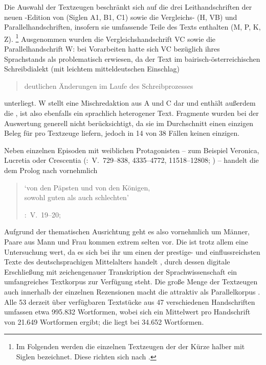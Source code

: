 Die Auswahl der Textzeugen beschränkt sich auf die drei Leithandschriften der
neuen \KC{}-Edition von \citeauthor{chincaetal2019b} (Siglen A1, B1, C1) sowie
die Vergleichs- (H, VB) und Parallelhandschriften, insofern sie umfassende
Teile des Texts enthalten (M, P, K, Z).%
%
	\footnote{Im Folgenden werden die einzelnen Textzeugen der \KC{} der
	Kürze halber mit Siglen bezeichnet. Diese richten sich nach
	 \autocite{kcdigital}.}
%
Ausgenommen wurden die Vergleichshandschrift VC sowie die Parallelhandschrift
W: bei Vorarbeiten hatte sich VC bezüglich ihres Sprachstands als problematisch
erwiesen, da der Text im bairisch-österreichischen
Schreibdialekt (mit leichtem mitteldeutschen Einschlag)
\blockcquote[73]{wolf:kckat}{deutlichen Änderungen im Laufe des
Schreibprozesses} unterliegt. W stellt eine Mischredaktion aus A und C dar und
enthält außerdem die  \autocite[48--54]{weis2022},
ist also ebenfalls ein sprachlich heterogener Text. Fragmente wurden bei der
Auswertung generell nicht berücksichtigt, da sie im Durchschnitt einen einzigen
Beleg für  pro Textzeuge liefern, jedoch in 14 von 38 Fällen keinen
einzigen.

Neben einzelnen Episoden mit weiblichen Protagonisten -- zum Beispiel Veronica,
Lucretia oder Crescentia (\KC:~V.~729--838, 4335--4772, 11518--12808;
\cite[vgl.][94--96, 161--169, 292--314]{schroeder1895}) -- handelt die \KC{} dem
Prolog nach vornehmlich

\blockquote[{\KC:~V.~19--20; \cite[79]{schroeder1895}}]{

	`von den Päpsten und von den Königen,\\
	sowohl guten als auch schlechten'
}

Aufgrund der thematischen Ausrichtung geht es also vornehmlich um Männer, Paare
aus Mann und Frau kommen extrem selten vor. Die \KC{} ist trotz allem eine
Untersuchung wert, da es sich bei ihr um einen der prestige- und
einflussreichsten Texte des deutschsprachigen Mittelalters handelt
\autocite[93]{wolf2008}, durch dessen digitale Erschließung mit zeichengenauer
Transkription \autocite{kcdigital} der Sprachwissenschaft ein umfangreiches
Textkorpus zur Verfügung steht. Die große Menge der Textzeugen auch innerhalb
der einzelnen Rezensionen macht die \KC{} attraktiv als Parallelkorpus
\autocite{cysouwwaelchli2007}. Alle 53 derzeit über 
verfügbaren Textstücke aus 47 verschiedenen Handschriften umfassen etwa 995.832
Wortformen, wobei sich ein Mittelwert pro Handschrift von 21.649 Wortformen
ergibt; die  liegt bei 34.652 Wortformen.

